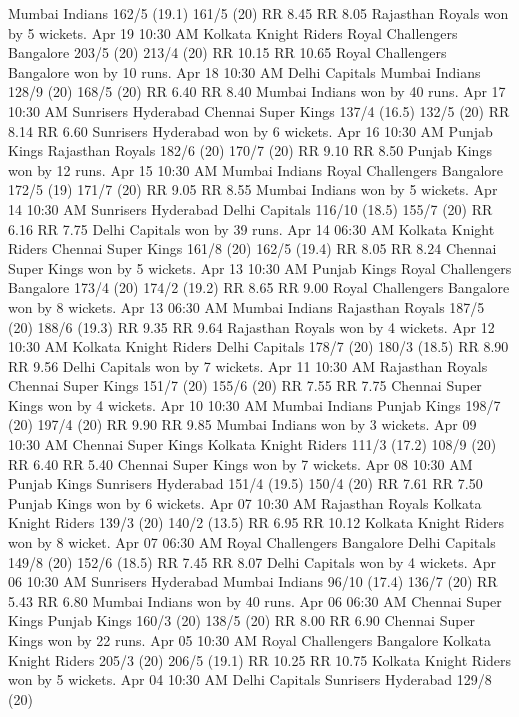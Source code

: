 Mumbai Indians
162/5 (19.1)
161/5 (20)
RR 8.45
RR 8.05
Rajasthan Royals won by 5 wickets.
Apr 19
10:30 AM
Kolkata Knight Riders
Royal Challengers Bangalore
203/5 (20)
213/4 (20)
RR 10.15
RR 10.65
Royal Challengers Bangalore won by 10 runs.
Apr 18
10:30 AM
Delhi Capitals
Mumbai Indians
128/9 (20)
168/5 (20)
RR 6.40
RR 8.40
Mumbai Indians won by 40 runs.
Apr 17
10:30 AM
Sunrisers Hyderabad
Chennai Super Kings
137/4 (16.5)
132/5 (20)
RR 8.14
RR 6.60
Sunrisers Hyderabad won by 6 wickets.
Apr 16
10:30 AM
Punjab Kings
Rajasthan Royals
182/6 (20)
170/7 (20)
RR 9.10
RR 8.50
Punjab Kings won by 12 runs.
Apr 15
10:30 AM
Mumbai Indians
Royal Challengers Bangalore
172/5 (19)
171/7 (20)
RR 9.05
RR 8.55
Mumbai Indians won by 5 wickets.
Apr 14
10:30 AM
Sunrisers Hyderabad
Delhi Capitals
116/10 (18.5)
155/7 (20)
RR 6.16
RR 7.75
Delhi Capitals won by 39 runs.
Apr 14
06:30 AM
Kolkata Knight Riders
Chennai Super Kings
161/8 (20)
162/5 (19.4)
RR 8.05
RR 8.24
Chennai Super Kings won by 5 wickets.
Apr 13
10:30 AM
Punjab Kings
Royal Challengers Bangalore
173/4 (20)
174/2 (19.2)
RR 8.65
RR 9.00
Royal Challengers Bangalore won by 8 wickets.
Apr 13
06:30 AM
Mumbai Indians
Rajasthan Royals
187/5 (20)
188/6 (19.3)
RR 9.35
RR 9.64
Rajasthan Royals won by 4 wickets.
Apr 12
10:30 AM
Kolkata Knight Riders
Delhi Capitals
178/7 (20)
180/3 (18.5)
RR 8.90
RR 9.56
Delhi Capitals won by 7 wickets.
Apr 11
10:30 AM
Rajasthan Royals
Chennai Super Kings
151/7 (20)
155/6 (20)
RR 7.55
RR 7.75
Chennai Super Kings won by 4 wickets.
Apr 10
10:30 AM
Mumbai Indians
Punjab Kings
198/7 (20)
197/4 (20)
RR 9.90
RR 9.85
Mumbai Indians won by 3 wickets.
Apr 09
10:30 AM
Chennai Super Kings
Kolkata Knight Riders
111/3 (17.2)
108/9 (20)
RR 6.40
RR 5.40
Chennai Super Kings won by 7 wickets.
Apr 08
10:30 AM
Punjab Kings
Sunrisers Hyderabad
151/4 (19.5)
150/4 (20)
RR 7.61
RR 7.50
Punjab Kings won by 6 wickets.
Apr 07
10:30 AM
Rajasthan Royals
Kolkata Knight Riders
139/3 (20)
140/2 (13.5)
RR 6.95
RR 10.12
Kolkata Knight Riders won by 8 wicket.
Apr 07
06:30 AM
Royal Challengers Bangalore
Delhi Capitals
149/8 (20)
152/6 (18.5)
RR 7.45
RR 8.07
Delhi Capitals won by 4 wickets.
Apr 06
10:30 AM
Sunrisers Hyderabad
Mumbai Indians
96/10 (17.4)
136/7 (20)
RR 5.43
RR 6.80
Mumbai Indians won by 40 runs.
Apr 06
06:30 AM
Chennai Super Kings
Punjab Kings
160/3 (20)
138/5 (20)
RR 8.00
RR 6.90
Chennai Super Kings won by 22 runs.
Apr 05
10:30 AM
Royal Challengers Bangalore
Kolkata Knight Riders
205/3 (20)
206/5 (19.1)
RR 10.25
RR 10.75
Kolkata Knight Riders won by 5 wickets.
Apr 04
10:30 AM
Delhi Capitals
Sunrisers Hyderabad
129/8 (20)
